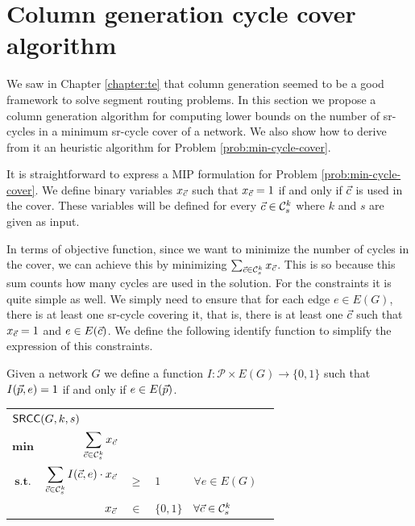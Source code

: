 \section{Column generation cycle cover algorithm}

We saw in Chapter \ref{chapter:te} that column generation seemed to be a good framework to solve segment routing
problems. In this section we propose a column generation algorithm for computing lower bounds on the number of sr-cycles in a
minimum sr-cycle cover of a network. We also show how to derive from it an heuristic algorithm for Problem \ref{prob:min-cycle-cover}.

It is straightforward to express a MIP formulation for Problem \ref{prob:min-cycle-cover}. We define binary
variables $x_{\vec{c}}$ such that $x_{\vec{c}} = 1$ if and only if $\vec{c}$ is used in the cover. These variables
will be defined for every $\vec{c} \in \mathcal{C}^k_s$ where $k$ and $s$ are given as input. 

In terms of objective function, since we want to minimize the number of cycles in the cover, we can achieve this
by minimizing $\sum_{\vec{c} \in \mathcal{C}^k_s} x_{\vec{c}}$. This is so because this sum counts how many cycles
are used in the solution. For the constraints it is quite simple as well. We simply need to ensure that for each
edge $e \in E(G)$, there is at least one sr-cycle covering it, that is, there is at least one $\vec{c}$ such that
$x_{\vec{c}} = 1$ and $e \in E(\vec{c})$. We define the following identify function to simplify the expression of this constraints.

\begin{definition}
Given a network $G$ we define a function $I : \mathcal{P} \times E(G) \rightarrow \{0, 1\}$ such that
$I(\vec{p}, e) = 1$ if and only if $e \in E(\vec{p})$.
\end{definition}

\begin{center}
\begin{tabular}{crcllr}
\multicolumn{5}{l}{$\textsf{SRCC}(G, k, s)$} \\[0.5cm] 
$\mathbf{min}$ & $\displaystyle \sum_{\vec{c} \in \mathcal{C}^k_s} x_{\vec{c}}$ & & & & \\[0.5cm]
$\textbf{s.t.}$ & $\displaystyle \sum_{\vec{c} \in \mathcal{C}^k_s} I(\vec{c}, e) \cdot x_{\vec{c}}$  & $\geq$ & $1$ & $\forall e \in E(G)$ & \\[0.5cm]
                & $x_{\vec{c}}$ & $\in$ & $\{0, 1\}$ & $\forall \vec{c} \in \mathcal{C}^k_s$
\end{tabular}
\end{center}

